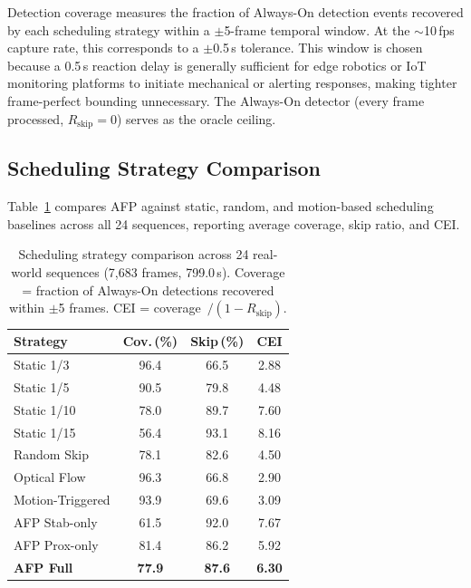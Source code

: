 \documentclass[conference]{IEEEtran}
\begin{document}
Detection coverage measures the fraction of Always-On detection
events recovered by each scheduling strategy within a $\pm$5-frame
temporal window. At the $\sim$10\,fps capture rate, this corresponds
to a $\pm$0.5\,s tolerance. This window is chosen because a 0.5\,s
reaction delay is generally sufficient for edge robotics or IoT
monitoring platforms to initiate mechanical or alerting responses,
making tighter frame-perfect bounding unnecessary. The Always-On detector (every frame processed,
$R_\text{skip} = 0$) serves as the oracle ceiling.

\subsection{Scheduling Strategy Comparison}

Table~\ref{tab:comparison} compares AFP against static, random, and
motion-based scheduling baselines across all 24 sequences, reporting
average coverage, skip ratio, and CEI.

\begin{table}[t]
  \centering
  \caption{Scheduling strategy comparison across 24 real-world
    sequences (7,683 frames, 799.0\,s). Coverage = fraction of
    Always-On detections recovered within $\pm$5 frames.
    CEI = coverage~$/(1 - R_\text{skip})$.}
  \label{tab:comparison}
  \begin{tabular}{@{}lccc@{}}
    \toprule
    \textbf{Strategy}
      & \textbf{Cov.\,(\%)}
      & \textbf{Skip\,(\%)}
      & \textbf{CEI} \\
    \midrule
    Static 1/3        & 96.4 & 66.5 & 2.88 \\
    Static 1/5        & 90.5 & 79.8 & 4.48 \\
    Static 1/10       & 78.0 & 89.7 & 7.60 \\
    Static 1/15       & 56.4 & 93.1 & 8.16 \\
    \midrule
    Random Skip       & 78.1 & 82.6 & 4.50 \\
    Optical Flow      & 96.3 & 66.8 & 2.90 \\
    Motion-Triggered  & 93.9 & 69.6 & 3.09 \\
    \midrule
    AFP Stab-only     & 61.5 & 92.0 & 7.67 \\
    AFP Prox-only     & 81.4 & 86.2 & 5.92 \\
    \textbf{AFP Full} & \textbf{77.9} & \textbf{87.6} & \textbf{6.30} \\
    \bottomrule
  \end{tabular}
\end{table}
\end{document}
